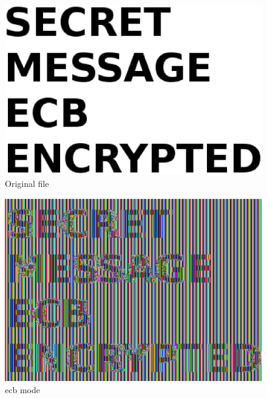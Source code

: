 \begin{minipage}{\linewidth}
      \centering
  \begin{minipage}{0.32\linewidth}
          \begin{figure}[H]
              \includegraphics[width=\linewidth]{figures/ECB.eps}
              \caption{Original file}
              \label{fig:tuxclr}
          \end{figure}
  \end{minipage}
  \begin{minipage}{0.32\linewidth}
          \begin{figure}[H]
              \includegraphics[width=\linewidth]{figures/ECB-enc.eps}
              \caption{\gls{ecb} mode}
              \label{fig:tuxecb}
          \end{figure}

\end{minipage}
\end{minipage}
